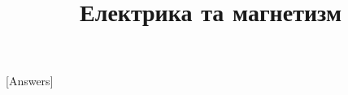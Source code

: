 \documentclass[biblatex]{ProblemBook}
\title{Електрика та магнетизм}
\begin{document}
\CoverPage
\maketitle
\makeinfopage
{}[Answers]

%
%
%
%
%
%
\end{document}
